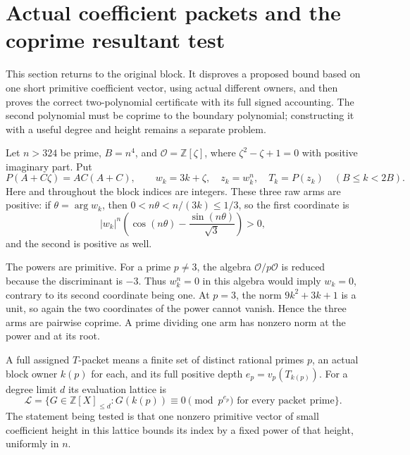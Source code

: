 \section{Actual coefficient packets and the coprime resultant test}
\label{cg19-section}

This section returns to the original block. It disproves a proposed
bound based on one short primitive coefficient vector, using actual
different owners, and then proves the correct two-polynomial
certificate with its full signed accounting. The second polynomial
must be coprime to the boundary polynomial; constructing it with a
useful degree and height remains a separate problem.

Let \(n>324\) be prime, \(B=n^4\), and
\(\mathcal O=\mathbb Z[\zeta]\), where \(\zeta^2-\zeta+1=0\) with
positive imaginary part. Put
\[
 P(A+C\zeta)=AC(A+C),\qquad
 w_k=3k+\zeta,\quad z_k=w_k^n,\quad T_k=P(z_k)
 \quad(B\le k<2B).
\]
Here and throughout the block indices are integers. These three
raw arms are positive: if \(\theta=\arg w_k\), then
\(0<n\theta<n/(3k)\le1/3\), so the first coordinate is
\[
 |w_k|^n\left(\cos(n\theta)-\frac{\sin(n\theta)}{\sqrt3}\right)>0,
\]
and the second is positive as well.

The powers are primitive. For a prime \(p\ne3\), the algebra
\(\mathcal O/p\mathcal O\) is reduced because the discriminant is
\(-3\). Thus \(w_k^n=0\) in this algebra would imply \(w_k=0\),
contrary to its second coordinate being one. At \(p=3\), the norm
\(9k^2+3k+1\) is a unit, so again the two coordinates of the power
cannot vanish. Hence the three arms are pairwise coprime. A prime
dividing one arm has nonzero norm at the power and at its root.

A full assigned \(T\)-packet means a finite set of distinct rational
primes \(p\), an actual block owner \(k(p)\) for each, and its full
positive depth \(e_p=v_p(T_{k(p)})\). For a degree limit \(d\) its
evaluation lattice is
\[
 \mathcal L=\{G\in\mathbb Z[X]_{\le d}:
     G(k(p))\equiv0\pmod{p^{e_p}}\text{ for every packet prime}\}.
\]
The statement being tested is that one nonzero primitive vector of
small coefficient height in this lattice bounds its index by a fixed
power of that height, uniformly in \(n\).

